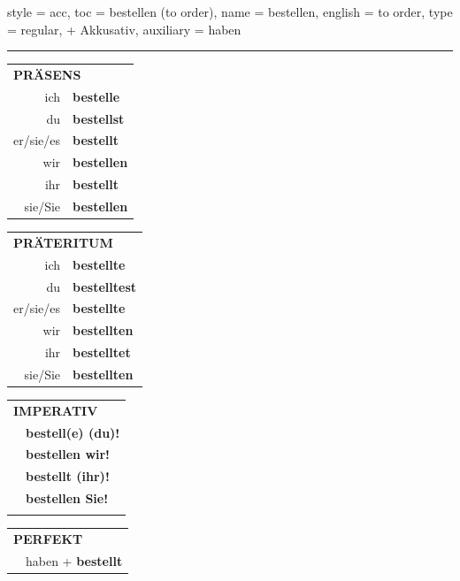 \begin{verbentry}{
  style = {acc},
  toc = {bestellen (to order)},
  name = {bestellen},
  english = {to order},
  type = {regular, + Akkusativ},
  auxiliary = {haben}
}
 
    
     \vspace{5pt}

    \hrule
    
    \vspace{5pt}

  \begin{tabular}{rl}
     \multicolumn{2}{l}{\textbf{PRÄSENS} }\\
    ich & \textbf{bestelle}\\
    du & \textbf{bestellst}\\
    er/sie/es & \textbf{bestellt}\\
    wir & \textbf{bestellen}\\
    ihr & \textbf{bestellt}\\
    sie/Sie & \textbf{bestellen}\\
  \end{tabular}
  \hfill
     \begin{tabular}{rl}
    \multicolumn{2}{l}{\textbf{PRÄTERITUM} }\\
    ich & \textbf{bestellte}\\
    du & \textbf{bestelltest}\\
    er/sie/es & \textbf{bestellte}\\
    wir & \textbf{bestellten}\\
    ihr & \textbf{bestelltet}\\
    sie/Sie & \textbf{bestellten}\\
  \end{tabular}
  \hfill
  \begin{tabular}{rl}
     \multicolumn{2}{l}{\textbf{IMPERATIV} }\\
   & \textbf{bestell(e) (du)!}\\
   & \textbf{bestellen wir!}\\
   & \textbf{bestellt (ihr)!}\\
   & \textbf{bestellen Sie!}\\
   & \vspace{10pt}
  \end{tabular}

    \vspace{10pt}

 \begin{tabular}{rl}
     \multicolumn{2}{l}{\textbf{PERFEKT}}\\
   & haben + \textbf{bestellt}\\
  \end{tabular}
\hfill
   \begin{tabular}{rl}
   

\end{tabular}
\end{verbentry}
